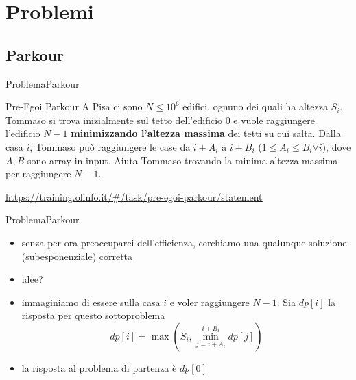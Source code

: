 \documentclass[compress]{beamer}
\begin{document}
\section{Problemi}

\subsection{Parkour}
\begin{frame}{Problema}{Parkour}
    \begin{exampleblock}{Pre-Egoi Parkour}
        A Pisa ci sono $N \leq 10^6$ edifici, ognuno dei quali ha altezza $S_i$. Tommaso si trova inizialmente sul tetto dell'edificio $0$ e vuole raggiungere l'edificio $N-1$ \textbf{minimizzando l'altezza massima} dei tetti su cui salta.
        Dalla casa $i$, Tommaso pu\`o raggiungere le case da $i+A_i$ a $i+B_i$ ($1 \leq A_i \leq B_i \forall i$), dove $A,B$ sono array in input.
        Aiuta Tommaso trovando la minima altezza massima per raggiungere $N-1$.
    \end{exampleblock}
    \small{\underline{\url{https://training.olinfo.it/\#/task/pre-egoi-parkour/statement}}}
\end{frame}

\begin{frame}{Problema}{Parkour}
    \begin{itemize}
        \item senza per ora preoccuparci dell'efficienza, cerchiamo una qualunque soluzione (subesponenziale) corretta
        \item idee?
        \pause
        \item immaginiamo di essere sulla casa $i$ e voler raggiungere $N-1$. Sia $dp[i]$ la risposta per questo sottoproblema
        $$dp[i] = \max\left(S_i, \min_{j = i + A_i}^{i + B_i} dp[j]\right)$$
        \item la risposta al problema di partenza \`e $dp[0]$
    \end{itemize}
\end{frame}
\end{document}
